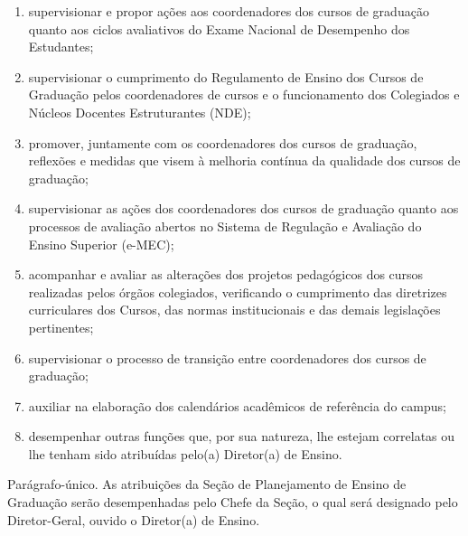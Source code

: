 \documentclass[a4paper,12pt]{report}
\begin{document}
\begin{enumerate}
\renewcommand{\labelenumi}{\Roman{enumi}}

\item supervisionar e propor ações aos coordenadores dos cursos de graduação quanto aos 
      ciclos avaliativos do Exame Nacional de Desempenho dos Estudantes;
      
\item supervisionar o cumprimento do Regulamento de Ensino dos Cursos de Graduação pelos 
      coordenadores de cursos  e o funcionamento dos Colegiados e Núcleos Docentes Estruturantes (NDE);
      
\item promover, juntamente com os coordenadores dos cursos de graduação, reflexões e 
      medidas que visem à melhoria contínua da qualidade dos cursos de graduação;
      
\item supervisionar as ações dos coordenadores dos cursos de graduação quanto aos processos       de avaliação abertos no Sistema de Regulação e Avaliação do Ensino Superior (e-MEC);
      
\item acompanhar e avaliar as alterações dos projetos pedagógicos dos cursos realizadas 
      pelos órgãos colegiados, verificando o cumprimento das diretrizes curriculares dos Cursos, das normas institucionais e das demais legislações 
      pertinentes;

\item supervisionar o processo de transição entre coordenadores dos cursos de graduação;

\item auxiliar na elaboração dos calendários acadêmicos de referência do campus;

\item desempenhar outras funções que, por sua natureza, lhe estejam correlatas ou lhe 
      tenham sido atribuídas pelo(a) Diretor(a) de Ensino.
\end{enumerate}

Parágrafo-único. As atribuições da Seção de Planejamento de Ensino de Graduação serão desempenhadas pelo Chefe da Seção, o qual será designado pelo Diretor-Geral, ouvido o Diretor(a) de Ensino.


\end{document}
